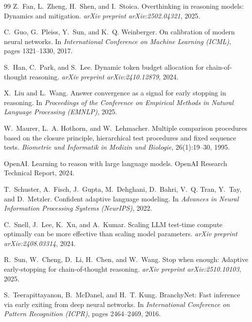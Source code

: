 \documentclass[11pt]{article}
\begin{document}
\begin{thebibliography}{99}
Z.~Fan, L.~Zheng, H.~Shen, and I.~Stoica.
\newblock Overthinking in reasoning models: Dynamics and mitigation.
\newblock \emph{arXiv preprint arXiv:2502.04321}, 2025.

C.~Guo, G.~Pleiss, Y.~Sun, and K.~Q. Weinberger.
\newblock On calibration of modern neural networks.
\newblock In \emph{International Conference on Machine Learning (ICML)}, pages 1321--1330, 2017.

S.~Han, C.~Park, and S.~Lee.
\newblock Dynamic token budget allocation for chain-of-thought reasoning.
\newblock \emph{arXiv preprint arXiv:2410.12879}, 2024.

X.~Liu and L.~Wang.
\newblock Answer convergence as a signal for early stopping in reasoning.
\newblock In \emph{Proceedings of the Conference on Empirical Methods in Natural Language Processing (EMNLP)}, 2025.

W.~Maurer, L.~A. Hothorn, and W.~Lehmacher.
\newblock Multiple comparison procedures based on the closure principle, hierarchical test procedures and fixed sequence tests.
\newblock \emph{Biometrie und Informatik in Medizin und Biologie}, 26(1):19--30, 1995.

{OpenAI}.
\newblock Learning to reason with large language models.
\newblock OpenAI Research Technical Report, 2024.

T.~Schuster, A.~Fisch, J.~Gupta, M.~Dehghani, D.~Bahri, V.~Q. Tran, Y.~Tay, and D.~Metzler.
\newblock Confident adaptive language modeling.
\newblock In \emph{Advances in Neural Information Processing Systems (NeurIPS)}, 2022.

C.~Snell, J.~Lee, K.~Xu, and A.~Kumar.
\newblock Scaling LLM test-time compute optimally can be more effective than scaling model parameters.
\newblock \emph{arXiv preprint arXiv:2408.03314}, 2024.

R.~Sun, W.~Cheng, D.~Li, H.~Chen, and W.~Wang.
\newblock Stop when enough: Adaptive early-stopping for chain-of-thought reasoning.
\newblock \emph{arXiv preprint arXiv:2510.10103}, 2025.

S.~Teerapittayanon, B.~McDanel, and H.~T. Kung.
\newblock BranchyNet: Fast inference via early exiting from deep neural networks.
\newblock In \emph{International Conference on Pattern Recognition (ICPR)}, pages 2464--2469, 2016.


\end{thebibliography}
\end{document}
